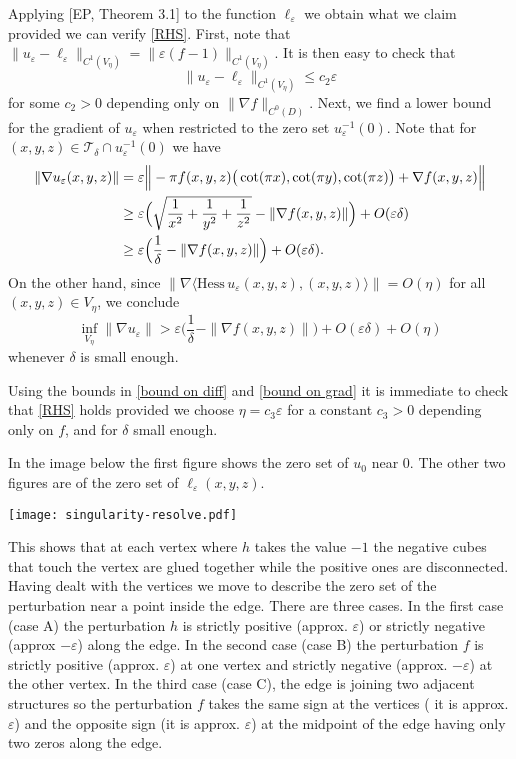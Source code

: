 \documentclass[11pt,reqno]{amsart}
\newcommand{\ep}{\varepsilon}
\theoremstyle{definition}
\begin{document}
  Applying [EP, Theorem 3.1]  to the function $\ell_\ep$ we obtain what we claim provided we can verify \eqref{RHS}.  
  First, note that $\|u_\ep-\ell_\ep\|_{C^1(V_\eta)}=\|\ep(f-1)\|_{C^1(V_\eta)}$. It  is then easy to check that 
  \begin{equation}\label{bound on diff}
  \|u_\ep-\ell_\ep\|_{C^1(V_\eta)}\leq c_2 \ep
  \end{equation}
 for some $c_2>0$ depending only on $\|\nabla f\|_{C^0(D)}$.
Next, we find a lower bound for the gradient of $u_\ep$ when restricted to the zero set $u_\ep^{-1}(0)$. Note that for $(x,y,z) \in \mathcal T_\delta \cap u_\ep^{-1}(0)$ we have
\begin{align}
\|\nabla u_\ep (x,y,z)\|
&= \ep \Big  \|  -\pi  f(x,y,z) \big( \cot(\pi x), \cot (\pi y), \cot(\pi z) \big)    + \nabla f(x,y,z) \Big \|   \label{gradient}   \\
& \geq \ep \Big(\sqrt{ \frac{1}{x^2}+\frac{1}{y^2}+\frac{1}{z^2}}- \|\nabla f(x,y,z)\|\Big) + O(\ep \delta) \notag\\
& \geq \ep \Big(\frac{1}{\delta}- \|\nabla f(x,y,z)\|\Big) + O(\ep \delta).\notag
\end{align}
On the other hand, since $ \|\nabla \langle \text{Hess} \,u_\ep (x,y,z) , (x,y,z) \rangle\|=O(\eta)$ for all $(x,y,z) \in  V_\eta$, we conclude
\begin{equation}\label{bound on grad}
\inf_{V_\eta} \|\nabla u_\ep \| > \ep\Big(\frac{1}{\delta}- \|\nabla f(x,y,z)\|\Big) + O(\ep \delta)+O(\eta)
\end{equation}
 whenever $\delta$ is small enough. 

Using the bounds in \eqref{bound on diff} and \eqref{bound on grad} it is immediate to check that  \eqref{RHS} holds  provided we choose 
 $\eta =  c_3 \ep$ for a constant  $c_3>0$  depending only on $f$, and for $\delta$ small enough.
  
  
In the image below the first figure shows the zero set of $u_0$ near $0$. The other two figures are of the zero set of $\ell_\ep(x,y,z)$.
\begin{center}
\texttt{[image: singularity-resolve.pdf]}
\end{center}
This shows that at each vertex where $h$ takes the value $-1$ the negative cubes that touch the vertex are glued together while the positive ones are disconnected.\\

 Having dealt with the vertices we move to describe the zero set of the perturbation near a point inside the edge. 
There are three cases. In the first case (case A) the perturbation $h$ is strictly positive (approx. $\ep$) or strictly negative (approx $-\ep$) along the edge. In the second case (case B) the perturbation $f$ is strictly positive (approx. $\ep$)  at one vertex and strictly negative (approx. $-\ep$) at the other vertex. In the third case (case C), the edge is joining two adjacent structures so the perturbation $f$ takes the same sign at the vertices ( it is approx. $\ep$) and the opposite sign  (it is approx. $\ep$) at the midpoint of the edge having only two zeros along the edge.\\
\end{document}

